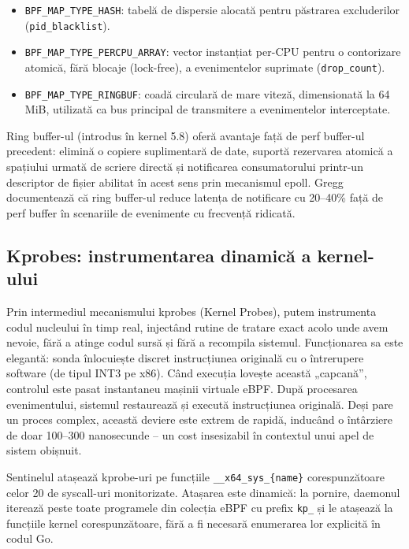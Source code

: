 \begin{itemize}
    \item \texttt{BPF\_MAP\_TYPE\_HASH}: tabelă de dispersie alocată pentru păstrarea excluderilor (\texttt{pid\_blacklist}).
    \item \texttt{BPF\_MAP\_TYPE\_PERCPU\_ARRAY}: vector instanțiat per-CPU pentru o contorizare atomică, fără blocaje (lock-free), a evenimentelor suprimate (\texttt{drop\_count}).
    \item \texttt{BPF\_MAP\_TYPE\_RINGBUF}: coadă circulară de mare viteză, dimensionată la 64 MiB, utilizată ca bus principal de transmitere a evenimentelor interceptate.
\end{itemize}

\par Ring buffer-ul (introdus în kernel 5.8) oferă avantaje față de perf buffer-ul precedent: elimină o copiere suplimentară de date, suportă rezervarea atomică a spațiului urmată de scriere directă și notificarea consumatorului printr-un descriptor de fișier abilitat în acest sens prin mecanismul epoll. Gregg \cite{Gregg2019} documentează că ring buffer-ul reduce latența de notificare cu 20--40\% față de perf buffer în scenariile de evenimente cu frecvență ridicată.


\subsection{Kprobes: instrumentarea dinamică a kernel-ului}
\label{subsec:kprobes}

\par Prin intermediul mecanismului kprobes (Kernel Probes), putem instrumenta codul nucleului în timp real, injectând rutine de tratare exact acolo unde avem nevoie, fără a atinge codul sursă și fără a recompila sistemul. Funcționarea sa este elegantă: sonda înlocuiește discret instrucțiunea originală cu o întrerupere software (de tipul INT3 pe x86). Când execuția lovește această „capcană”, controlul este pasat instantaneu mașinii virtuale eBPF. După procesarea evenimentului, sistemul restaurează și execută instrucțiunea originală. Deși pare un proces complex, această deviere este extrem de rapidă, inducând o întârziere de doar 100–300 nanosecunde – un cost insesizabil în contextul unui apel de sistem obișnuit.

\par Sentinelul atașează kprobe-uri pe funcțiile \texttt{\_\_x64\_sys\_\{name\}} corespunzătoare celor 20 de syscall-uri monitorizate. Atașarea este dinamică: la pornire, daemonul iterează peste toate programele din colecția eBPF cu prefix \texttt{kp\_} și le atașează la funcțiile kernel corespunzătoare, fără a fi necesară enumerarea lor explicită în codul Go.

